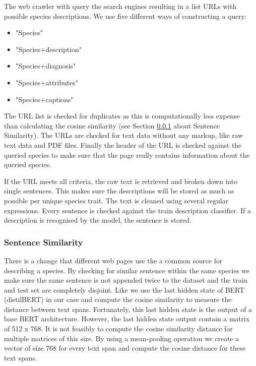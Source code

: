 \documentclass[a4paper, 12pt, oneside]{book} %
\begin{document}
The web crawler with query the search engines resulting in a list URLs with possible species descriptions.
We use five different ways of constructing a query:
\begin{itemize}
    \item "Species"
    \item "Species+description"
    \item "Species+diagnosis"
    \item "Species+attributes"
    \item "Species+captions"
\end{itemize}
The URL list is checked for duplicates as this is computationally less expense than calculating the cosine similarity (see Section \ref{Sentence Similarity} about Sentence Similarity).
The URLs are checked for text data without any markup, like raw text data and PDF files.
Finally the header of the URL is checked against the queried species to make sure that the page really contains information about the queried species.

If the URL meets all criteria, the raw text is retrieved and broken down into single sentences. 
This makes sure the descriptions will be stored as much as possible per unique species trait.
The text is cleaned using several regular expressions.
Every sentence is checked against the train description classifier.
If a description is recognised by the model, the sentence is stored.

\subsubsection{Sentence Similarity} \label{Sentence Similarity}
There is a change that different web pages use the a common source for describing a species.
By checking for similar sentence within the same species we make sure the same sentence is not appended twice to the dataset and the train and test set are completely disjoint.
Like \textcite{reimers_sentence-bert_2019} we use the last hidden state of BERT (distilBERT) in our case and compute the cosine similarity to measure the distance between text spans.
Fortunately, this last hidden state is the output of a base BERT architecture.
However, the last hidden state output contain a matrix of 512 x 768. 
It is not feasibly to compute the cosine similarity distance for multiple matrices of this size.
By using a mean-pooling operation we create a vector of size 768 for every text span and compute the cosine distance for these text spans.
\end{document}
